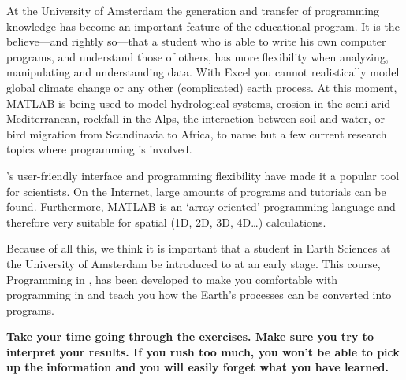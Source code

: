 At the University of Amsterdam the generation and transfer of programming knowledge has become an important feature of the educational program. It is the believe---and rightly so---that a student who is able to write his own computer programs, and understand those of others, has more flexibility when analyzing, manipulating and understanding data. With Excel you cannot realistically model global climate change or any other (complicated) earth process. At this moment, MATLAB is being used to model hydrological systems, erosion in the semi-arid Mediterranean, rockfall in the Alps, the interaction between soil and water, or bird migration from Scandinavia to Africa, to name but a few current research topics where programming is involved.

\MATLAB{}'s user-friendly interface and programming flexibility have made it a popular tool for scientists. On the Internet, large amounts of \MATLAB{} programs and tutorials can be found. Furthermore, MATLAB is an `array-oriented' programming language and therefore very suitable for spatial (1D, 2D, 3D, 4D\dots) calculations.

Because of all this, we think it is important that a student in Earth Sciences at the University of Amsterdam be introduced to \MATLAB{} at an early stage. This course, Programming in \MATLAB{}, has been developed to make you comfortable with programming in \MATLAB{} and teach you how the Earth's processes can be converted into \MATLAB{} programs.

\vspace{2em}

\noindent \textbf{Take your time going through the exercises. Make sure you try to interpret your results. If you rush too much, you won't be able to pick up the information and you will easily forget what you have learned. }



